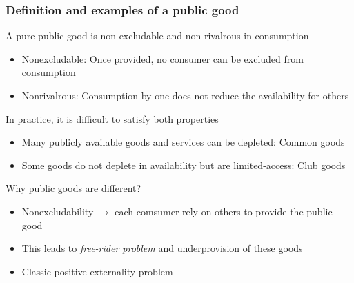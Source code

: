 \documentclass[aspectratio=169]{beamer}
\begin{document}
\begin{frame}
\frametitle{Definition and examples of a public good} 
A pure public good is non-excludable and non-rivalrous in consumption
\begin{itemize}\setlength\itemsep{3pt}
\item Nonexcludable: Once provided, no consumer can be excluded from consumption
\item Nonrivalrous: Consumption by one does not reduce the availability for others
\end{itemize}\medskip
In practice, it is difficult to satisfy both properties
\begin{itemize}\setlength\itemsep{3pt}
\item Many publicly available goods and services can be depleted: Common goods
\item Some goods do not deplete in availability but are limited-access: Club goods 
\end{itemize}\medskip
Why public goods are different?
\begin{itemize}\setlength\itemsep{3pt}
\item Nonexcludability $\to$ each comsumer rely on others to provide the public good
\item This leads to \textit{free-rider problem} and underprovision of these goods
\item Classic positive externality problem 
\end{itemize}\medskip
\end{frame}
\end{document}
